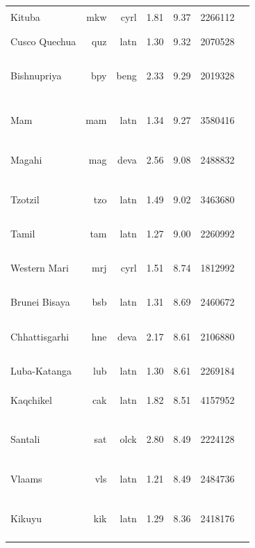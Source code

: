 \documentclass[11pt]{article}
\begin{document}
\begin{center}
\begin{longtable}[width=0.9\textwidth]{|lrrrrrl|}
Kituba & mkw & cyrl & 1.81 & 9.37 & 2266112 & {\color{other}\rule{4.0cm}{8pt}} \\ 
Cusco Quechua & quz & latn & 1.30 & 9.32 & 2070528 & {\color{glot500}\rule{0.0cm}{8pt}}{\color{other}\rule{4.0cm}{8pt}} \\ 
Bishnupriya & bpy & beng & 2.33 & 9.29 & 2019328 & {\color{oscar}\rule{0.2cm}{8pt}}{\color{glot500}\rule{2.73cm}{8pt}}{\color{other}\rule{1.0699999999999998cm}{8pt}} \\ 
Mam & mam & latn & 1.34 & 9.27 & 3580416 & {\color{madlad400}\rule{1.88cm}{8pt}}{\color{glot500}\rule{1.42cm}{8pt}}{\color{other}\rule{0.7000000000000002cm}{8pt}} \\ 
Magahi & mag & deva & 2.56 & 9.08 & 2488832 & {\color{nllb}\rule{3.11cm}{8pt}}{\color{madlad400}\rule{0.8900000000000001cm}{8pt}} \\ 
Tzotzil & tzo & latn & 1.49 & 9.02 & 3463680 & {\color{madlad400}\rule{2.03cm}{8pt}}{\color{glot500}\rule{0.57cm}{8pt}}{\color{other}\rule{1.4000000000000004cm}{8pt}} \\ 
Tamil & tam & latn & 1.27 & 9.00 & 2260992 & {\color{madlad400}\rule{4.0cm}{8pt}} \\ 
Western Mari & mrj & cyrl & 1.51 & 8.74 & 1812992 & {\color{oscar}\rule{0.11cm}{8pt}}{\color{madlad400}\rule{2.78cm}{8pt}}{\color{other}\rule{1.1100000000000003cm}{8pt}} \\ 
Brunei Bisaya & bsb & latn & 1.31 & 8.69 & 2460672 & {\color{glot500}\rule{4.0cm}{8pt}} \\ 
Chhattisgarhi & hne & deva & 2.17 & 8.61 & 2106880 & {\color{nllb}\rule{3.09cm}{8pt}}{\color{madlad400}\rule{0.29cm}{8pt}}{\color{glot500}\rule{0.6200000000000001cm}{8pt}} \\ 
Luba-Katanga & lub & latn & 1.30 & 8.61 & 2269184 & {\color{madlad400}\rule{4.0cm}{8pt}} \\ 
Kaqchikel & cak & latn & 1.82 & 8.51 & 4157952 & {\color{glot500}\rule{1.59cm}{8pt}}{\color{other}\rule{2.41cm}{8pt}} \\ 
Santali & sat & olck & 2.80 & 8.49 & 2224128 & {\color{nllb}\rule{0.24cm}{8pt}}{\color{glot500}\rule{1.67cm}{8pt}}{\color{other}\rule{2.09cm}{8pt}} \\ 
Vlaams & vls & latn & 1.21 & 8.49 & 2484736 & {\color{glot500}\rule{2.39cm}{8pt}}{\color{other}\rule{1.6099999999999999cm}{8pt}} \\ 
Kikuyu & kik & latn & 1.29 & 8.36 & 2418176 & {\color{nllb}\rule{2.27cm}{8pt}}{\color{glot500}\rule{0.11cm}{8pt}}{\color{other}\rule{1.62cm}{8pt}} \\ 

\end{longtable}
\end{center}
\end{document}
